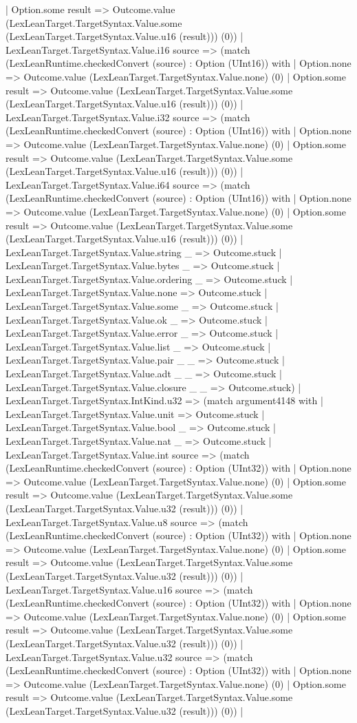 \documentclass[11pt]{article}
\begin{document}
| Option.some result => Outcome.value (LexLeanTarget.TargetSyntax.Value.some (LexLeanTarget.TargetSyntax.Value.u16 (result))) (0)) | LexLeanTarget.TargetSyntax.Value.i16 source => (match (LexLeanRuntime.checkedConvert (source) : Option (UInt16)) with | Option.none => Outcome.value (LexLeanTarget.TargetSyntax.Value.none) (0) | Option.some result => Outcome.value (LexLeanTarget.TargetSyntax.Value.some (LexLeanTarget.TargetSyntax.Value.u16 (result))) (0)) | LexLeanTarget.TargetSyntax.Value.i32 source => (match (LexLeanRuntime.checkedConvert (source) : Option (UInt16)) with | Option.none => Outcome.value (LexLeanTarget.TargetSyntax.Value.none) (0) | Option.some result => Outcome.value (LexLeanTarget.TargetSyntax.Value.some (LexLeanTarget.TargetSyntax.Value.u16 (result))) (0)) | LexLeanTarget.TargetSyntax.Value.i64 source => (match (LexLeanRuntime.checkedConvert (source) : Option (UInt16)) with | Option.none => Outcome.value (LexLeanTarget.TargetSyntax.Value.none) (0) | Option.some result => Outcome.value (LexLeanTarget.TargetSyntax.Value.some (LexLeanTarget.TargetSyntax.Value.u16 (result))) (0)) | LexLeanTarget.TargetSyntax.Value.string \_ => Outcome.stuck | LexLeanTarget.TargetSyntax.Value.bytes \_ => Outcome.stuck | LexLeanTarget.TargetSyntax.Value.ordering \_ => Outcome.stuck | LexLeanTarget.TargetSyntax.Value.none => Outcome.stuck | LexLeanTarget.TargetSyntax.Value.some \_ => Outcome.stuck | LexLeanTarget.TargetSyntax.Value.ok \_ => Outcome.stuck | LexLeanTarget.TargetSyntax.Value.error \_ => Outcome.stuck | LexLeanTarget.TargetSyntax.Value.list \_ => Outcome.stuck | LexLeanTarget.TargetSyntax.Value.pair \_ \_ => Outcome.stuck | LexLeanTarget.TargetSyntax.Value.adt \_ \_ => Outcome.stuck | LexLeanTarget.TargetSyntax.Value.closure \_ \_ => Outcome.stuck) | LexLeanTarget.TargetSyntax.IntKind.u32 => (match argument4148 with | LexLeanTarget.TargetSyntax.Value.unit => Outcome.stuck | LexLeanTarget.TargetSyntax.Value.bool \_ => Outcome.stuck | LexLeanTarget.TargetSyntax.Value.nat \_ => Outcome.stuck | LexLeanTarget.TargetSyntax.Value.int source => (match (LexLeanRuntime.checkedConvert (source) : Option (UInt32)) with | Option.none => Outcome.value (LexLeanTarget.TargetSyntax.Value.none) (0) | Option.some result => Outcome.value (LexLeanTarget.TargetSyntax.Value.some (LexLeanTarget.TargetSyntax.Value.u32 (result))) (0)) | LexLeanTarget.TargetSyntax.Value.u8 source => (match (LexLeanRuntime.checkedConvert (source) : Option (UInt32)) with | Option.none => Outcome.value (LexLeanTarget.TargetSyntax.Value.none) (0) | Option.some result => Outcome.value (LexLeanTarget.TargetSyntax.Value.some (LexLeanTarget.TargetSyntax.Value.u32 (result))) (0)) | LexLeanTarget.TargetSyntax.Value.u16 source => (match (LexLeanRuntime.checkedConvert (source) : Option (UInt32)) with | Option.none => Outcome.value (LexLeanTarget.TargetSyntax.Value.none) (0) | Option.some result => Outcome.value (LexLeanTarget.TargetSyntax.Value.some (LexLeanTarget.TargetSyntax.Value.u32 (result))) (0)) | LexLeanTarget.TargetSyntax.Value.u32 source => (match (LexLeanRuntime.checkedConvert (source) : Option (UInt32)) with | Option.none => Outcome.value (LexLeanTarget.TargetSyntax.Value.none) (0) | Option.some result => Outcome.value (LexLeanTarget.TargetSyntax.Value.some (LexLeanTarget.TargetSyntax.Value.u32 (result))) (0)) | 
\end{document}
